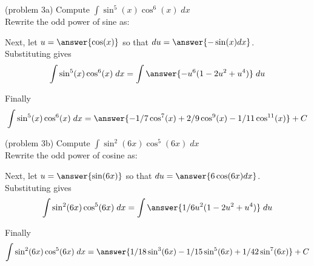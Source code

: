 \documentclass{ximera}
\begin{document}
\begin{problem}(problem 3a) 
Compute $\displaystyle{\int \sin^5(x)\cos^6(x) \; dx}$\\

Rewrite the odd power of sine as:

\begin{multipleChoice}
\end{multipleChoice}

Next, let $u = \answer{\cos(x)}$ so that $du = \answer{-\sin(x) dx}$.\\

Substituting gives
\[
\int \sin^5(x)\cos^6(x) \; dx= \int \answer{-u^6(1-2u^2 + u^4)} \; du
\]

Finally
\[
\int \sin^5(x)\cos^6(x) \; dx= \answer{-1/7 \cos^7(x) + 2/9 \cos^9(x) - 1/11 \cos^{11}(x)} + C
\]

\end{problem}



\begin{problem}{\color{gray}(problem 3b)} 
Compute $\displaystyle{\int \sin^2(6x)\cos^5(6x) \; dx}$\\

Rewrite the odd power of cosine as:

\begin{multipleChoice}
\end{multipleChoice}

Next, let $u = \answer{\sin(6x)}$ so that $du = \answer{6 \cos(6x) dx}$.\\

Substituting gives
\[
\int \sin^2(6x)\cos^5(6x) \; dx= \int \answer{1/6 u^2(1-2u^2 + u^4)} \; du
\]

Finally
\[
\int \sin^2(6x)\cos^5(6x) \; dx= \answer{1/18 \sin^3(6x) - 1/15 \sin^5(6x) + 1/42 \sin^7(6x)} + C
\]
\end{problem}
\end{document}
